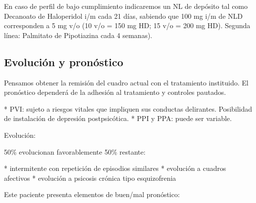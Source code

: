 \documentclass{scrbook}
\begin{document}
En caso de perfil de bajo cumplimiento indicaremos un NL de depósito tal como Decanoato de Haloperidol i/m cada 21 días, sabiendo que 100 mg i/m de NLD corresponden a 5 mg v/o (10 v/o = 150 mg HD; 15 v/o = 200 mg HD). Segunda línea: Palmitato de Pipotiazina cada 4 semanas).

\subsection*{Evolución y pronóstico}

Pensamos obtener la remisión del cuadro actual con el tratamiento instituido. El pronóstico dependerá de la adhesión al tratamiento y controles pautados.

* PVI: sujeto a riesgos vitales que impliquen sus conductas delirantes. Posibilidad de instalación de depresión postpsicótica.
* PPI y PPA: puede ser variable.

Evolución:

50\% evolucionan favorablemente 50\% restante:

* intermitente con repetición de episodios similares
* evolución a cuadros afectivos
* evolución a psicosis crónica tipo esquizofrenia

Este paciente presenta elementos de buen/mal pronóstico:
\end{document}

